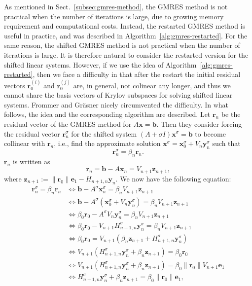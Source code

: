 {As mentioned in Sect.\ \ref{subsec:gmres-method}, the GMRES method is not practical when the number of iterations is large, due to growing memory requirement and computational costs. Instead, the restarted GMRES method is useful in practice, and was described in Algorithm\ \ref{alg:gmres-restarted}. For the same reason, the shifted GMRES method is not practical when the number of iterations is large. It is therefore natural to consider the restarted version for the shifted linear systems. However, if we use the idea of Algorithm\ \ref{alg:gmres-restarted}, then we face a difficulty in that after the restart the initial residual vectors $\bm r_0^{(i)}$ and $\bm r_0^{(j)}$ are, in general, not colinear any longer, and thus we cannot share the basis vectors of Krylov subspaces for solving shifted linear systems.}
{Frommer and Gräsner  nicely circumvented the difficulty. In what follows, the idea and the corresponding algorithm are described. Let $\bm r_n$ be the residual vector of the GMRES method for $A\bm x=\bm b$. Then they consider forcing the residual vector $\bm r_n^{\sigma}$ for the shifted system $(A+\sigma I)\bm x^{\sigma}=\bm b$ to become collinear with $\bm r_n$, i.e., find the approximate solution $\bm x^{\sigma}=\bm x_0^{\sigma}+V_n\bm y_n^{\sigma}$ such that}
\[\bm r_n^{\sigma}=\beta_n\bm r_n.\]
{$\bm r_n$ is written as}
\[\bm r_n=\bm b-A\bm x_n=V_{n+1}\bm z_{n+1},\]
{where $\bm z_{n+1}:=\|\bm r_0\|\bm e_1-H_{n+1,n}\bm y_n$. We now have the following equation:}
\[\begin{aligned}\bm r_n^{\sigma}=\beta_n\bm r_n&\Leftrightarrow\bm b-A^{\sigma}\bm x_n^{\sigma}=\beta_nV_{n+1}\bm z_{n+1}\\
&\Leftrightarrow\bm b-A^{\sigma}(\bm x_0^{\sigma}+V_n\bm y_n^{\sigma})=\beta_nV_{n+1}\bm z_{n+1}\\
&\Leftrightarrow\beta_0\bm r_0-A^{\sigma}V_n\bm y_n^{\sigma}=\beta_nV_{n+1}\bm z_{n+1}\\
&\Leftrightarrow\beta_0\bm r_0-V_{n+1}H_{n+1,n}^{\sigma}\bm y_n^{\sigma}=\beta_nV_{n+1}\bm z_{n+1}\\
&\Leftrightarrow\beta_0\bm r_0=V_{n+1}(\beta_n\bm z_{n+1}+H_{n+1,n}^{\sigma}\bm y_n^{\sigma})\\
&\Leftrightarrow V_{n+1}(H_{n+1,n}^{\sigma}\bm y_n^{\sigma}+\beta_n\bm z_{n+1})=\beta_0\bm r_0\\
&\Leftrightarrow V_{n+1}(H_{n+1,n}^{\sigma}\bm y_n^{\sigma}+\beta_n\bm z_{n+1})=\beta_0\|\bm r_0\|V_{n+1}\bm e_1\\
&\Leftrightarrow H_{n+1,n}^{\sigma}\bm y_n^{\sigma}+\beta_n\bm z_{n+1}=\beta_0\|\bm r_0\|\bm e_1,\end{aligned}\]
